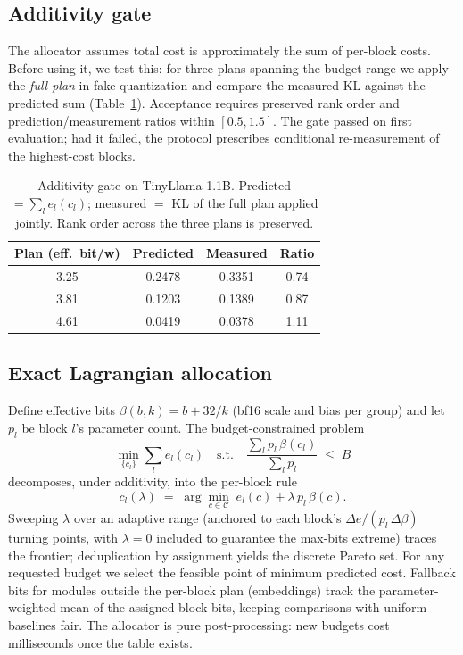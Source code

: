 \documentclass{article}
\begin{document}
\subsection{Additivity gate}
\label{sec:gate}

The allocator assumes total cost is approximately the sum of per-block
costs. Before using it, we test this: for three plans spanning the budget
range we apply the \emph{full plan} in fake-quantization and compare the
measured KL against the predicted sum (Table~\ref{tab:gate}). Acceptance
requires preserved rank order and prediction/measurement ratios within
$[0.5, 1.5]$. The gate passed on first evaluation; had it failed, the
protocol prescribes conditional re-measurement of the highest-cost blocks.

\begin{table}[t]
\centering
\caption{Additivity gate on TinyLlama-1.1B. Predicted $=\sum_l e_l(c_l)$;
measured $=$ KL of the full plan applied jointly. Rank order across the
three plans is preserved.}
\label{tab:gate}
\begin{tabular}{cccc}
\toprule
\textbf{Plan (eff.\ bit/w)} & \textbf{Predicted} & \textbf{Measured} & \textbf{Ratio} \\
\midrule
3.25 & 0.2478 & 0.3351 & 0.74 \\
3.81 & 0.1203 & 0.1389 & 0.87 \\
4.61 & 0.0419 & 0.0378 & 1.11 \\
\bottomrule
\end{tabular}
\end{table}

\subsection{Exact Lagrangian allocation}
\label{sec:allocator}

Define effective bits $\beta(b,k) = b + 32/k$ (bf16 scale and bias per
group) and let $p_l$ be block $l$'s parameter count. The budget-constrained
problem
\begin{equation}
  \min_{\{c_l\}} \sum_l e_l(c_l)
  \quad\text{s.t.}\quad
  \frac{\sum_l p_l\, \beta(c_l)}{\sum_l p_l} \;\leq\; B
\end{equation}
decomposes, under additivity, into the per-block rule
\begin{equation}
  c_l(\lambda) \;=\; \arg\min_{c \in \mathcal{C}} \; e_l(c) + \lambda\, p_l\, \beta(c).
\end{equation}
Sweeping $\lambda$ over an adaptive range (anchored to each block's
$\Delta e / (p_l\, \Delta\beta)$ turning points, with $\lambda{=}0$ included
to guarantee the max-bits extreme) traces the frontier; deduplication by
assignment yields the discrete Pareto set. For any requested budget we
select the feasible point of minimum predicted cost. Fallback bits for
modules outside the per-block plan (embeddings) track the parameter-weighted
mean of the assigned block bits, keeping comparisons with uniform baselines
fair. The allocator is pure post-processing: new budgets cost milliseconds
once the table exists.
\end{document}
